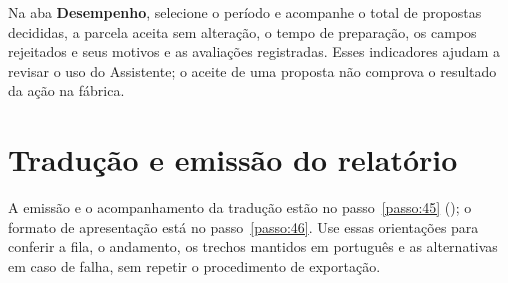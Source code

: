 \Needspace{100pt}
Na aba \textbf{Desempenho}, selecione o período e acompanhe o total de propostas
decididas, a parcela aceita sem alteração, o tempo de preparação, os campos
rejeitados e seus motivos e as avaliações registradas. Esses indicadores ajudam
a revisar o uso do Assistente; o aceite de uma proposta não comprova o resultado
da ação na fábrica.

\section{Tradução e emissão do relatório}

A emissão e o acompanhamento da tradução estão no passo~\ref{passo:45}
(); o formato de apresentação está no passo~\ref{passo:46}.
Use essas orientações para conferir a fila, o andamento, os trechos mantidos em
português e as alternativas em caso de falha, sem repetir o procedimento de exportação.

\fimdecapitulo
